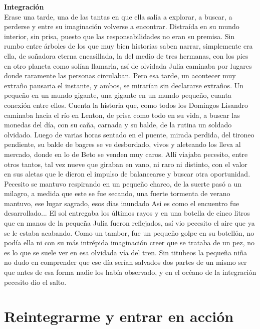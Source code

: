 \documentclass[12pt, a4paper, twoside]{book} %
\begin{document}
\noindent\textbf{Integración}\\
Erase una tarde, una de las tantas en que ella salía a explorar, a buscar, a perderse y entre su imaginación volverse a encontrar. Distraída en su mundo interior, sin prisa, puesto que las responsabilidades no eran su premisa. Sin rumbo entre árboles de los que muy bien  historias saben narrar, simplemente era ella, de soñadora eterna encasillada,  la del medio de tres hermanas, con los pies en otro planeta como solían llamarla, así de olvidada Julia caminaba por lugares donde raramente las personas circulaban.
Pero esa tarde, un acontecer muy extraño  pausaria el instante, y ambos, se mirarían sin declararse extraños.
Un pequeño en un mundo gigante, una gigante en un mundo pequeño, cuanta conexión entre ellos.
Cuenta la historia que, como todos los Domingos Lisandro caminaba hacia el río en Lenton, de prisa como todo en su vida, a buscar las monedas del día, con su caña, carnada y su balde, de la rutina un soldado olvidado.
Luego de varias horas sentado en el puente, mirada perdida, del tironeo pendiente, su balde de bagres se ve desbordado, vivos y aleteando los lleva al mercado, donde en lo de Beto se venden muy caros.
Allí viajaba pecesito, entre otros tantos, tal vez nueve que giraban en vano, ni raro ni distinto, con el valor en sus aletas que le dieron el impulso de balancearse y buscar otra oportunidad.
Pecesito se mantuvo respirando en un pequeño charco, de la suerte pasó a un milagro, a medida que este se fue secando, una fuerte tormenta de verano mantuvo, ese lugar sagrado, esos días inundado
Asi es como el encuentro fue desarrollado...
El sol entregaba los últimos rayos y en una botella de cinco litros que  en manos de la pequeña Julia  fueron reflejados, así vio pecesito el aire que ya se le estaba acabando.
Como un tambor, fue un pequeño golpe en su botellón, no podía ella ni  con su más intrépida imaginación creer que se trataba de un pez, no es lo que se suele ver en esa olvidada vía del tren.
Sin titubeos la pequeña niña no dudo en comprender que ese día serían salvados dos partes de un mismo ser que antes de esa forma nadie los había observado, y en el océano de la integración pecesito dio el salto.

\chapter{Reintegrarme y entrar en acción}
\end{document}
